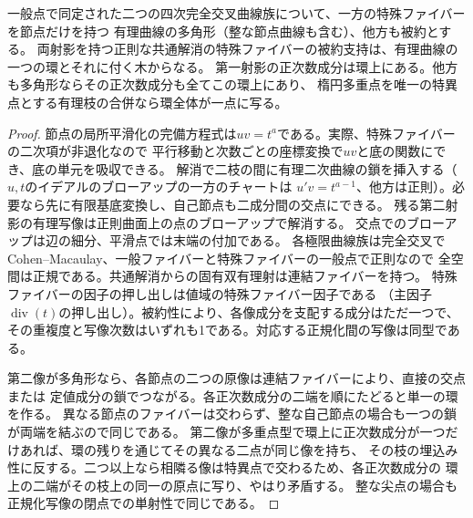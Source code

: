 \begin{lemma}[二つの被約モデルの成分]\label{lem:nodal-core-resolution}
一般点で同定された二つの四次完全交叉曲線族について、一方の特殊ファイバーを節点だけを持つ
有理曲線の多角形（整な節点曲線も含む）、他方も被約とする。
両射影を持つ正則な共通解消の特殊ファイバーの被約支持は、有理曲線の一つの環とそれに付く木からなる。
第一射影の正次数成分は環上にある。他方も多角形ならその正次数成分も全てこの環上にあり、
楕円多重点を唯一の特異点とする有理枝の合併なら環全体が一点に写る。
\end{lemma}
\begin{proof}
節点の局所平滑化の完備方程式は$uv=t^a$である。実際、特殊ファイバーの二次項が非退化なので
平行移動と次数ごとの座標変換で$uv$と底の関数にでき、底の単元を吸収できる。
解消で二枝の間に有理二次曲線の鎖を挿入する（$u,t$のイデアルのブローアップの一方のチャートは
$u'v=t^{a-1}$、他方は正則）。必要なら先に有限基底変換し、自己節点も二成分間の交点にできる。
残る第二射影の有理写像は正則曲面上の点のブローアップで解消する。
交点でのブローアップは辺の細分、平滑点では末端の付加である。
各極限曲線族は完全交叉でCohen--Macaulay、一般ファイバーと特殊ファイバーの一般点で正則なので
全空間は正規である。共通解消からの固有双有理射は連結ファイバーを持つ。
特殊ファイバーの因子の押し出しは値域の特殊ファイバー因子である
（主因子$\operatorname{div}(t)$の押し出し）。被約性により、各像成分を支配する成分はただ一つで、
その重複度と写像次数はいずれも1である。対応する正規化間の写像は同型である。

第二像が多角形なら、各節点の二つの原像は連結ファイバーにより、直接の交点または
定値成分の鎖でつながる。各正次数成分の二端を順にたどると単一の環を作る。
異なる節点のファイバーは交わらず、整な自己節点の場合も一つの鎖が両端を結ぶので同じである。
第二像が多重点型で環上に正次数成分が一つだけあれば、環の残りを通じてその異なる二点が同じ像を持ち、
その枝の埋込み性に反する。二つ以上なら相隣る像は特異点で交わるため、各正次数成分の
環上の二端がその枝上の同一の原点に写り、やはり矛盾する。
整な尖点の場合も正規化写像の閉点での単射性で同じである。
\end{proof}

